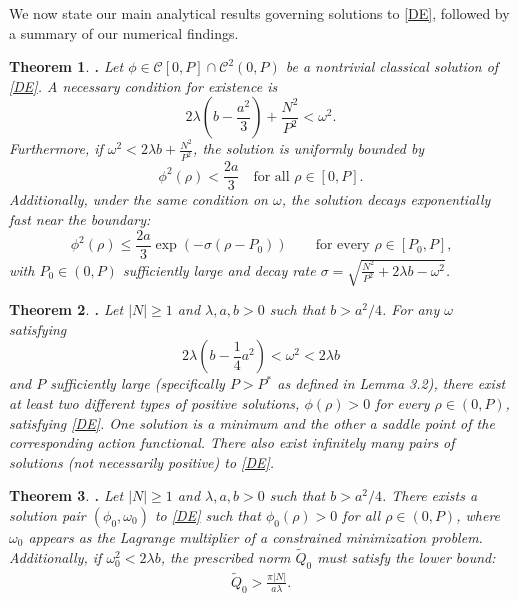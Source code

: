 \documentclass[12pt]{article}
\newtheorem{oldtheorem}{Theorem}[section]
\newenvironment{theorem}{\begin{oldtheorem}$\!\!\!${\bf.}}{\end{oldtheorem}}
\begin{document}
We now state our main analytical results governing solutions to \eqref{DE}, followed by a summary of our numerical findings.

\begin{theorem}
    Let $\phi\in\mathcal{C}[0,P]\cap\mathcal{C}^2(0,P)$ be a nontrivial classical solution of \eqref{DE}. A necessary condition for existence is
    \begin{equation}
        2\lambda\left(b - \frac{a^2}{3}\right) + \frac{N^2}{ P^2} < \omega^2.
        \label{OmegaLowerBnd}\end{equation}
    Furthermore, if $\omega^2 < 2\lambda b + \frac{N^2}{P^2}$, the solution is uniformly bounded by
    \begin{equation}
        \phi^2(\rho) < \frac{2a}{3} \quad \text{for all } \rho \in [0, P].
    \end{equation}
    Additionally, under the same condition on $\omega$, the solution decays exponentially fast near the boundary:
    \begin{equation}
        \phi^2(\rho)\leq \frac{2a}{3}\exp(-\sigma(\rho-P_0))\qquad\text{for every $\rho\in[P_0,P]$,}
    \end{equation}
    with $P_0\in(0,P)$ sufficiently large and decay rate $\sigma = \sqrt{\frac{N^2}{P^2}+2\lambda b-\omega^2}$.
\end{theorem}

\begin{theorem}
    Let $|N|\geq 1$ and $\lambda,a,b>0$ such that $b>a^2/4$. For any $\omega$ satisfying
    \begin{equation}
        2\lambda\left(b-\dfrac{1}{4}a^2\right)<\omega^2<2\lambda b
    \end{equation}
    and $P$ sufficiently large (specifically $P > P^*$ as defined in Lemma 3.2), there exist at least two different types of positive solutions, $\phi(\rho)>0$ for every $\rho\in(0,P)$, satisfying \eqref{DE}. One solution is a minimum and the other a saddle point of the corresponding action functional. There also exist infinitely many pairs of solutions (not necessarily positive) to \eqref{DE}.
\end{theorem}

\begin{theorem}
    Let $|N|\geq 1$ and $\lambda,a,b>0$ such that $b>a^2/4$. There exists a solution pair $(\phi_0,\omega_0)$ to \eqref{DE} such that $\phi_0(\rho)>0$ for all $\rho\in(0,P)$, where $\omega_0$ appears as the Lagrange multiplier of a constrained minimization problem. Additionally, if $\omega_0^2 < 2\lambda b$, the prescribed norm $\tilde{Q}_0$ must satisfy the lower bound:
    \begin{align}
        \tilde{Q}_0 > \frac{\pi |N|}{a\lambda}.
    \end{align}
\end{theorem}
\end{document}
